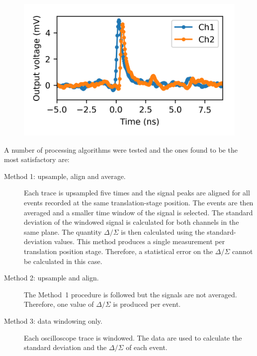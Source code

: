 \begin{figure}[!b]
\centering
\vspace{-1mm}
\includegraphics[scale=1, keepaspectratio]{pictures/single_bunch_scope}
\vspace*{-2mm}
\label{fig:diode_signal_1b}
\end{figure}




A number of processing algorithms were tested and the ones found to be the most satisfactory are: 
\begin{description}
\item[Method 1: upsample, align and average.] Each trace is upsampled five times and the signal peaks are aligned for all events recorded at the same translation-stage position. The events are then averaged and a smaller time window of the signal is selected. The standard deviation of the windowed signal is calculated for both channels in the same plane. The quantity $\Delta/\Sigma$ is then calculated using the standard-deviation values. This method produces a single measurement per translation position stage. Therefore, a statistical error on the $\Delta/\Sigma$ cannot be calculated in this case. 
%
\item[Method 2: upsample and align.] The Method~1 procedure is followed but the signals are not averaged. Therefore, one value of $\Delta/\Sigma$ is produced per event.
%
\item[Method 3: data windowing only.] Each oscilloscope trace is windowed. The data are used to calculate the standard deviation and the $\Delta/\Sigma$ of each event.
\end{description}


